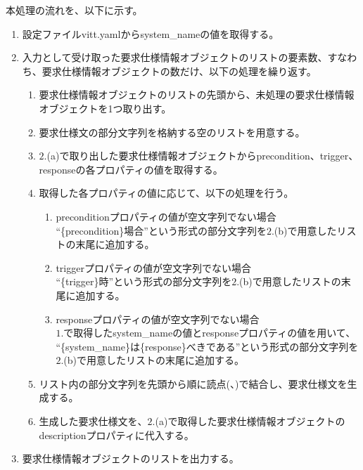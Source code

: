 本処理の流れを、以下に示す。
\begin{enumerate}
    \item 設定ファイルvitt.yamlからsystem\_nameの値を取得する。
    \item 入力として受け取った要求仕様情報オブジェクトのリストの要素数、すなわち、要求仕様情報オブジェクトの数だけ、以下の処理を繰り返す。
    \begin{enumerate}
        \item 要求仕様情報オブジェクトのリストの先頭から、未処理の要求仕様情報オブジェクトを1つ取り出す。
        \item 要求仕様文の部分文字列を格納する空のリストを用意する。
        \item $2$.(a)で取り出した要求仕様情報オブジェクトからprecondition、trigger、responseの各プロパティの値を取得する。
        \item 取得した各プロパティの値に応じて、以下の処理を行う。
        \begin{enumerate}
            \item preconditionプロパティの値が空文字列でない場合\\
            ``\{precondition\}場合''という形式の部分文字列を$2$.(b)で用意したリストの末尾に追加する。
            \item triggerプロパティの値が空文字列でない場合\\
            ``\{trigger\}時''という形式の部分文字列を$2$.(b)で用意したリストの末尾に追加する。
            \item responseプロパティの値が空文字列でない場合\\
            $1$.で取得したsystem\_nameの値とresponseプロパティの値を用いて、
            ``\{system\_name\}は\{response\}べきである''という形式の部分文字列を$2$.(b)で用意したリストの末尾に追加する。
        \end{enumerate}
        \item リスト内の部分文字列を先頭から順に読点(、)で結合し、要求仕様文を生成する。
        \item 生成した要求仕様文を、$2$.(a)で取得した要求仕様情報オブジェクトのdescriptionプロパティに代入する。
    \end{enumerate}   
    \item 要求仕様情報オブジェクトのリストを出力する。
\end{enumerate}

